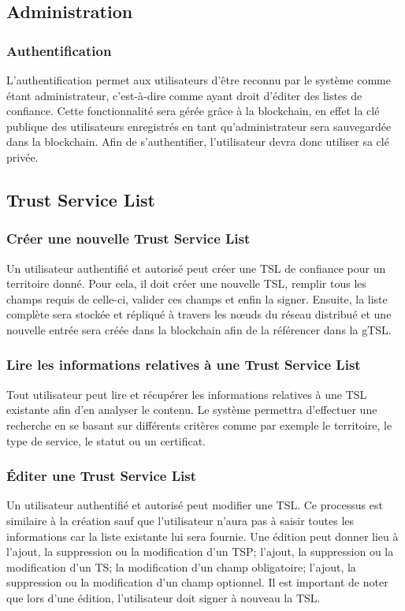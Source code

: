 \documentclass{tnreport}
\begin{document}
\subsection{Administration}
\subsubsection{Authentification}
L'authentification permet aux utilisateurs d'être reconnu par le système comme étant administrateur, c'est-à-dire comme ayant droit d'éditer des listes de confiance. Cette fonctionnalité sera gérée grâce à la blockchain, en effet la clé publique des utilisateurs enregistrés en tant qu'administrateur sera sauvegardée dans la blockchain. Afin de s'authentifier, l'utilisateur devra donc utiliser sa clé privée.

\subsection{Trust Service List}
\label{sec:tsl}
\subsubsection{Créer une nouvelle Trust Service List}
Un utilisateur authentifié et autorisé peut créer une TSL de confiance pour un territoire donné. Pour cela, il doit créer une nouvelle TSL, remplir tous les champs requis de celle-ci, valider ces champs et enfin la signer. Ensuite, la liste complète sera stockée et répliqué à travers les nœuds du réseau distribué et une nouvelle entrée sera créée dans la blockchain afin de la référencer dans la gTSL.
\subsubsection{Lire les informations relatives à une Trust Service List}
Tout utilisateur peut lire et récupérer les informations relatives à une TSL existante afin d'en analyser le contenu. Le système permettra d'effectuer une recherche en se basant sur différents critères comme par exemple le territoire, le type de service, le statut ou un certificat.
\subsubsection{Éditer une Trust Service List}
Un utilisateur authentifié et autorisé peut modifier une TSL. Ce processus est similaire à la création sauf que l'utilisateur n'aura pas à saisir toutes les informations car la liste existante lui sera fournie. Une édition peut donner lieu à l'ajout, la suppression ou la modification d'un TSP; l'ajout, la suppression ou la modification d'un TS; la modification d'un champ obligatoire; l'ajout, la suppression ou la modification d'un champ optionnel. Il est important de noter que lors d'une édition, l'utilisateur doit signer à nouveau la TSL.
\end{document}
